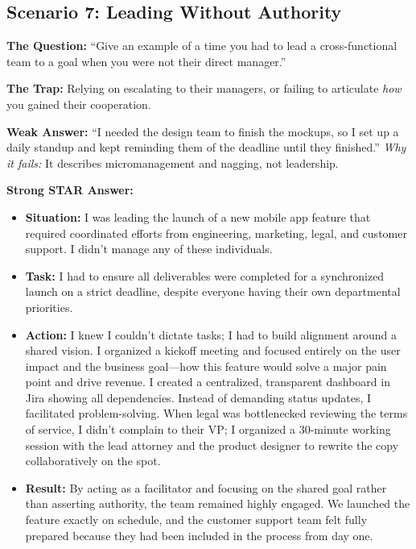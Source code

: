 \documentclass[
  11pt,
  openany,
  oneside]{book}
\providecommand{\tightlist}{%
  \setlength{\itemsep}{0pt}\setlength{\parskip}{0pt}}
\begin{document}
\subsection{Scenario 7: Leading Without
Authority}\label{scenario-7-leading-without-authority}

\textbf{The Question:} ``Give an example of a time you had to lead a
cross-functional team to a goal when you were not their direct
manager.''

\textbf{The Trap:} Relying on escalating to their managers, or failing
to articulate \emph{how} you gained their cooperation.

\textbf{Weak Answer:} ``I needed the design team to finish the mockups,
so I set up a daily standup and kept reminding them of the deadline
until they finished.'' \emph{Why it fails:} It describes micromanagement
and nagging, not leadership.

\textbf{Strong STAR Answer:}

\begin{itemize}
\tightlist
\item
  \textbf{Situation:} I was leading the launch of a new mobile app
  feature that required coordinated efforts from engineering, marketing,
  legal, and customer support. I didn't manage any of these individuals.
\item
  \textbf{Task:} I had to ensure all deliverables were completed for a
  synchronized launch on a strict deadline, despite everyone having
  their own departmental priorities.
\item
  \textbf{Action:} I knew I couldn't dictate tasks; I had to build
  alignment around a shared vision. I organized a kickoff meeting and
  focused entirely on the user impact and the business goal---how this
  feature would solve a major pain point and drive revenue. I created a
  centralized, transparent dashboard in Jira showing all dependencies.
  Instead of demanding status updates, I facilitated problem-solving.
  When legal was bottlenecked reviewing the terms of service, I didn't
  complain to their VP; I organized a 30-minute working session with the
  lead attorney and the product designer to rewrite the copy
  collaboratively on the spot.
\item
  \textbf{Result:} By acting as a facilitator and focusing on the shared
  goal rather than asserting authority, the team remained highly
  engaged. We launched the feature exactly on schedule, and the customer
  support team felt fully prepared because they had been included in the
  process from day one.
\end{itemize}
\end{document}

